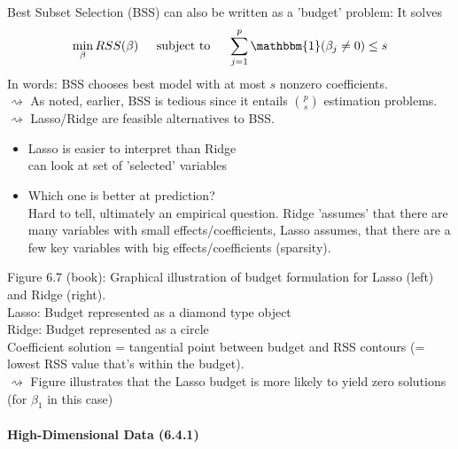 \documentclass[11pt,a4paper,numbers=endperiod]{scrartcl}
\newcommand{\id}{\hspace*{4mm}}
\newcommand{\tit}[1]{\begin{large} \underline{\text{#1}}\end{large}}
\begin{document}
{Best Subset Selection (BSS) can also be written as a 'budget' problem: It solves \begin{align*}
	\min\limits_{\beta} RSS(\beta) \id \text{ subject to } \id \sum\limits_{j = 1}^p \mathbbm{1}(\beta_j \neq 0) \leq s
\end{align*}
In words: BSS chooses best model with at most $s$ nonzero coefficients.\\
$\rightsquigarrow$ As noted, earlier, BSS is tedious since it entails $\binom{p}{s}$ estimation problems.\\
$\rightsquigarrow$ Lasso/Ridge are feasible alternatives to BSS.\\

\tit{Comparing Ridge and Lasso} \begin{itemize}
	\item Lasso is easier to interpret than Ridge\\
	 can look at set of 'selected' variables
	\item Which one is better at prediction?\\
	Hard to tell, ultimately an empirical question. Ridge 'assumes' that there are many variables with small effects/coefficients, Lasso assumes, that there are a few key variables with big effects/coefficients (sparsity).
\end{itemize}

Figure 6.7 (book): Graphical illustration of budget formulation for Lasso (left) and Ridge (right).\\
Lasso: Budget represented as a diamond type object\\
Ridge: Budget represented as a circle\\
Coefficient solution = tangential point between budget and RSS contours (= lowest RSS value that's within the budget).\\
$\rightsquigarrow$ Figure illustrates that the Lasso budget is more likely to yield zero solutions (for $\beta_1$ in this case) 

\paragraph{High-Dimensional Data (6.4.1)}

}
\end{document}
